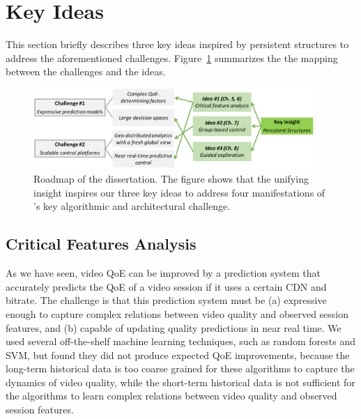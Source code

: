 \section{Key Ideas}
\label{sec:overview:solutions}

This section briefly describes three key ideas inspired by 
persistent structures
to address the aforementioned challenges. 
Figure~\ref{fig:overview-roadmap} summarizes the 
the mapping between the challenges and the ideas.


\begin{figure}[t!]
\centering
\includegraphics[width=0.95\textwidth]{figures/overview-roadmap.pdf}
\caption{Roadmap of the dissertation.
The figure shows that the unifying insight inspires 
our three key ideas to address four manifestations of
\ddn's key algorithmic and architectural challenge.}
\label{fig:overview-roadmap}
\end{figure}

\subsection{Critical Features Analysis}
\label{subsec:overview:cfa}

As we have seen, video QoE can be improved by
a prediction system that accurately predicts the QoE 
of a video session if it uses a certain CDN and bitrate.
The challenge is that this prediction system must be 
(a) expressive enough to capture complex relations 
between video quality and observed session features, 
and (b) capable of updating quality predictions in near 
real time.
We used several off-the-shelf machine learning 
techniques, such as random forests and SVM, but 
found they did not produce expected QoE improvements, 
because the long-term historical data is too coarse grained 
for these algorithms to capture the dynamics of video 
quality, while the short-term historical data is not sufficient 
for the algorithms to learn complex relations between 
video quality and observed session features.

